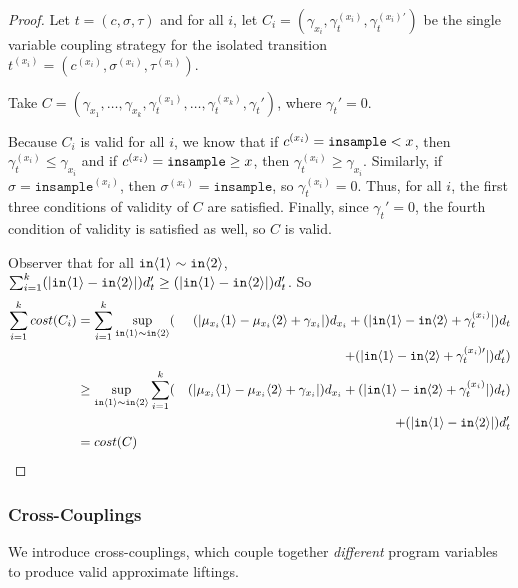 \begin{proof}
    Let $t = (c, \sigma, \tau)$ and for all $i$, let $C_i = (\gamma_{x_i}, \gamma_t^{(x_i)}, \gamma_t^{(x_i)\prime})$ be the single variable coupling strategy for the isolated transition $t^{(x_i)} = (c^{(x_i)}, \sigma^{(x_i)}, \tau^{(x_i)})$. 
    
    Take $C = (\gamma_{x_1}, \ldots, \gamma_{x_k}, \gamma_t^{(x_1)}, \ldots, \gamma_t^{(x_k)}, \gamma_t')$, where $\gamma_t' = 0$.

    Because $C_i$ is valid for all $i$, we know that if $c^{(x_i)} = \texttt{insample} < x$, then $\gamma_t^{(x_i)}\leq \gamma_{x_i}$ and if $c^{(x_i)} = \texttt{insample}\geq x$, then $\gamma_t^{(x_i)}\geq \gamma_{x_i}$. Similarly, if $\sigma = \texttt{insample}^{(x_i)}$, then $\sigma^{(x_i)} = \texttt{insample}$, so $\gamma_t^{(x_i)} = 0$. Thus, for all $i$, the first three conditions of validity of $C$ are satisfied. Finally, since $\gamma_t' = 0$, the fourth condition of validity is satisfied as well, so $C$ is valid.
    
    Observer that for all $\texttt{in}\langle1 \rangle\sim\texttt{in}\langle2 \rangle$, $\sum_{i=1}^k(|\texttt{in}\langle1 \rangle-\texttt{in}\langle2 \rangle|)d_t'\geq (|\texttt{in}\langle1 \rangle-\texttt{in}\langle2 \rangle|)d_t'$. 
    So \begin{alignat*}{2}
        \sum_{i=1}^k cost(C_i) &= \sum_{i=1}^k\sup_{\texttt{in}\langle1 \rangle\sim\texttt{in}\langle2 \rangle}(&(|\mu_{x_i}\langle1 \rangle-\mu_{x_i}\langle2 \rangle+\gamma_{x_i}|)d_{x_i}+(|\texttt{in}\langle1 \rangle-\texttt{in}\langle2 \rangle+\gamma_t^{(x_i)}|)d_t\\ & &+(|\texttt{in}\langle1 \rangle-\texttt{in}\langle2 \rangle+\gamma_t^{(x_i)\prime}|)d_t')\\
        &\geq \sup_{\texttt{in}\langle1 \rangle\sim\texttt{in}\langle2 \rangle}\sum_{i=1}^k(&(|\mu_{x_i}\langle1 \rangle-\mu_{x_i}\langle2 \rangle+\gamma_{x_i}|)d_{x_i}+(|\texttt{in}\langle1 \rangle-\texttt{in}\langle2 \rangle+\gamma_t^{(x_i)}|)d_t)\\
         & &+(|\texttt{in}\langle1 \rangle-\texttt{in}\langle2 \rangle|)d_t'\\
        &= cost(C) &
    \end{alignat*}
\end{proof}

\subsubsection{Cross-Couplings}

We introduce cross-couplings, which couple together \textit{different} program variables to produce valid approximate liftings. 

